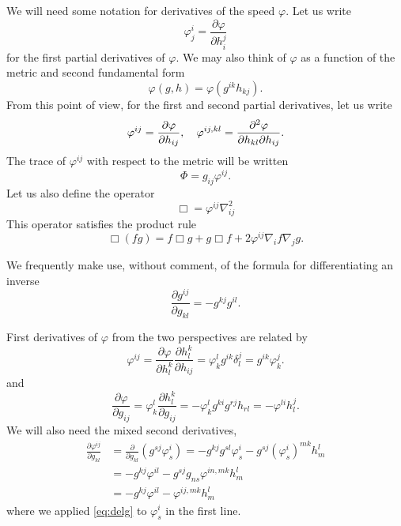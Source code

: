 \documentclass{amsart}
\begin{document}
We will need some notation for derivatives of the speed \(\varphi\). Let us write
\[
\varphi^{i}_{j} = \frac{\partial \varphi}{\partial h^{j}_{i}}
\]
for the first partial derivatives of \(\varphi\). We may also think of \(\varphi\) as a function of the metric and second fundamental form
\[
\varphi(g, h) = \varphi(g^{ik} h_{kj}).
\]
From this point of view, for the first and second partial derivatives, let us write
\[
\varphi^{ij} = \frac{\partial\varphi}{\partial h_{ij}}, \quad \varphi^{ij,kl} = \frac{\partial^2\varphi}{\partial h_{kl} \partial h_{ij}}.
\]
The trace of \(\varphi^{ij}\) with respect to the metric will be written
\[
\Phi = g_{ij} \varphi^{ij}.
\]
Let us also define the operator
\[
\Box = \varphi^{ij} \nabla^2_{ij}
\]
This operator satisfies the product rule
\begin{equation}
\label{eq:productbox}
\Box (fg) = f \Box g + g \Box f + 2 \varphi^{ij} \nabla_i f \nabla_j g.
\end{equation}

We frequently make use, without comment, of the formula for differentiating an inverse
\[
\frac{\partial g^{ij}}{\partial g_{kl}} = - g^{kj} g^{il}.
\]

First derivatives of \(\varphi\) from the two perspectives are related by
\begin{equation}
\label{eq:delh}
\varphi^{ij} = \frac{\partial \varphi}{\partial h_l^k} \frac{\partial h_l^k}{\partial h_{ij}} = \varphi^l_k g^{ik} \delta^j_l = g^{ik} \varphi^j_k.
\end{equation}
and
\begin{equation}
\label{eq:delg}
\frac{\partial\varphi}{\partial g_{ij}} = \varphi^{l}_{k} \frac{\partial h^{k}_{l}}{\partial g_{ij}} = -\varphi^{l}_{k} g^{ki} g^{rj} h_{rl} = -\varphi^{li}h^{j}_{l}.
\end{equation}
We will also need the mixed second derivatives,
\begin{equation}
\label{eq:delhdelg}
\begin{split}
\frac{\partial \varphi^{ij}}{\partial g_{kl}} &= \frac{\partial}{\partial g_{kl}} \left(g^{sj} \varphi^{i}_{s} \right) = - g^{kj}g^{sl} \varphi^{i}_{s} - g^{sj} (\varphi^i_s)^{mk} h^l_m \\
&= - g^{kj} \varphi^{il} - g^{sj} g_{ns} \varphi^{in,mk} h^l_m \\
&= - g^{kj} \varphi^{il} - \varphi^{ij,mk} h^l_m
\end{split}
\end{equation}
where we applied \cref{eq:delg} to \(\varphi^i_s\) in the first line.
\end{document}
